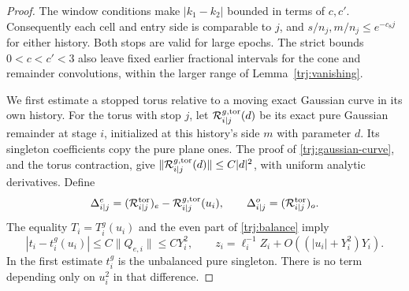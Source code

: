 \begin{proof}
The window conditions make \(|k_1-k_2|\) bounded in terms of \(c,c'\).
Consequently each cell and entry side is comparable to \(j\), and
\(s/n_j,m/n_j\le e^{-c_8j}\) for either history.  Both stops are valid
for large epochs.  The strict bounds \(0<c<c'<3\) also leave fixed
earlier fractional intervals for the cone and remainder convolutions,
within the larger range of Lemma~\ref{trj:vanishing}.

We first estimate a stopped torus relative to a moving exact Gaussian
curve in its own history.  For the torus with stop \(j\), let
\(\mathcal R^{g,\rm tor}_{i|j}(d)\) be its exact pure Gaussian remainder
at stage \(i\), initialized at this history's side \(m\) with parameter
\(d\).  Its singleton coefficients copy the pure plane ones.  The
proof of \eqref{trj:gaussian-curve}, and the torus contraction, give
\(\|\mathcal R^{g,\rm tor}_{i|j}(d)\|\le C|d|^2\), with uniform analytic
derivatives.  Define
\[
 \Delta^e_{i|j}=(\mathcal R^{\rm tor}_{i|j})_e
                         -\mathcal R^{g,\rm tor}_{i|j}(u_i),
 \qquad
 \Delta^o_{i|j}=(\mathcal R^{\rm tor}_{i|j})_o.
\]
The equality \(T_i=T_i^g(u_i)\) and the even part of
\eqref{trj:balance} imply
\begin{equation}\label{trj:scalar-from-curve}
 |t_i-t_i^g(u_i)|\le C\|Q_{e,i}\|\le CY_i^2,
 \qquad
 z_i=\ell_i^{-1}Z_i+O((|u_i|+Y_i^2)Y_i).
\end{equation}
In the first estimate \(t_i^g\) is the unbalanced pure singleton.
There is no term depending only on \(u_i^2\) in that difference.


\end{proof}
